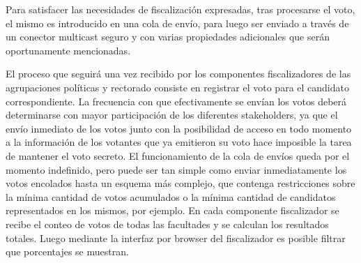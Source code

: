 Para satisfacer las necesidades de fiscalización expresadas, tras procesarse el voto, el mismo es introducido en una cola de envío, %
para luego ser enviado a través de un conector multicast seguro y con varias propiedades adicionales que serán oportunamente mencionadas.

El proceso que seguirá una vez recibido por los componentes fiscalizadores de las agrupaciones políticas y rectorado consiste en registrar el voto para el candidato correspondiente. La frecuencia con que efectivamente se envían los votos deberá determinarse con mayor participación de los diferentes stakeholders, ya que el envío inmediato de los votos junto con la posibilidad de acceso en todo momento a la información de los votantes que ya emitieron su voto hace imposible la tarea de mantener el voto secreto. El funcionamiento de la cola de envíos queda por el momento indefinido, pero puede ser tan simple como enviar inmediatamente los votos encolados hasta un esquema más complejo, que contenga restricciones sobre la mínima cantidad de votos acumulados o la mínima cantidad de candidatos representados en los mismos, por ejemplo.
En cada componente fiscalizador se recibe el conteo de votos de todas las facultades y se calculan los resultados totales. Luego mediante la interfaz por browser del fiscalizador es posible filtrar que porcentajes se muestran.

